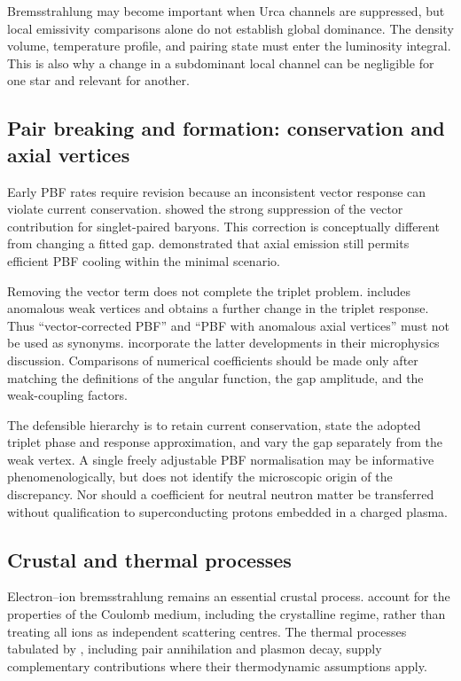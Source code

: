 \documentclass{aa}
\begin{document}
Bremsstrahlung may become important when Urca channels are suppressed, but local emissivity comparisons alone do not establish global dominance. The density volume, temperature profile, and pairing state must enter the luminosity integral. This is also why a change in a subdominant local channel can be negligible for one star and relevant for another.

\subsection{Pair breaking and formation: conservation and axial vertices}
\label{sec:pbf-response}
Early PBF rates require revision because an inconsistent vector response can violate current conservation. \citet{Leinson2006} showed the strong suppression of the vector contribution for singlet-paired baryons. This correction is conceptually different from changing a fitted gap. \citet{Page2009} demonstrated that axial emission still permits efficient PBF cooling within the minimal scenario.

Removing the vector term does not complete the triplet problem. \citet{Leinson2010} includes anomalous weak vertices and obtains a further change in the triplet response. Thus ``vector-corrected PBF'' and ``PBF with anomalous axial vertices'' must not be used as synonyms. \citet{Potekhin2018} incorporate the latter developments in their microphysics discussion. Comparisons of numerical coefficients should be made only after matching the definitions of the angular function, the gap amplitude, and the weak-coupling factors.

The defensible hierarchy is to retain current conservation, state the adopted triplet phase and response approximation, and vary the gap separately from the weak vertex. A single freely adjustable PBF normalisation may be informative phenomenologically, but does not identify the microscopic origin of the discrepancy. Nor should a coefficient for neutral neutron matter be transferred without qualification to superconducting protons embedded in a charged plasma.

\subsection{Crustal and thermal processes}
Electron--ion bremsstrahlung remains an essential crustal process. \citet{Kaminker1999} account for the properties of the Coulomb medium, including the crystalline regime, rather than treating all ions as independent scattering centres. The thermal processes tabulated by \citet{Itoh1996}, including pair annihilation and plasmon decay, supply complementary contributions where their thermodynamic assumptions apply.
\end{document}
